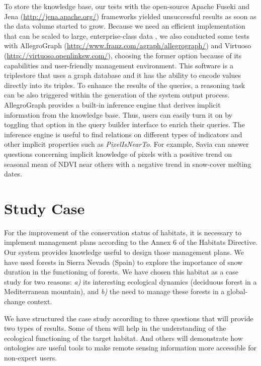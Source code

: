To store the knowledge base, our tests with the open-source Apache Fuseki and Jena (\url{http://jena.apache.org/}) frameworks yielded unsuccessful results as soon as the data volume started to grow. Because we need an efficient implementation that can be scaled to large, enterprise-class data \autocite{Wilkinsonetal2004EfficientRDF}, we also conducted some tests with AllegroGraph (\url{http://www.franz.com/agraph/allegrograph/}) and Virtuoso (\url{http://virtuoso.openlinksw.com/}), choosing the former option because of its capabilities and user-friendly management environment. This software is a triplestore that uses a graph database and it has the ability to encode values directly into its triples.
To enhance the results of the queries, a reasoning task can be also triggered within the generation of the system output process. AllegroGraph provides a built-in inference engine that derives implicit information from the knowledge base. Thus, users can easily turn it on by toggling that option in the query builder interface to enrich their queries. The inference engine is useful to find relations on different types of indicators and other implicit properties such as \emph{PixelIsNearTo}. For example, Savia can answer questions concerning implicit knowledge of pixels with a positive trend on seasonal mean of NDVI near others with a negative trend in snow-cover melting dates.

\section{Study Case}\label{sec:onto:CaseStudy}

For the improvement of the conservation status of habitats, it is necessary to implement management plans according to the Annex 6 of the Habitats Directive. Our system provides knowledge useful to design those management plans. We have used \Qp forests in Sierra Nevada (Spain) to explore the importance of snow duration in the functioning of \Qp forests. We have chosen this habitat as a case study for two reasons: \emph{a)} its interesting ecological dynamics (deciduous forest in a Mediterranean mountain), and \emph{b)} the need to manage these forests in a global-change context.

We have structured the case study according to three questions that will provide two types of results. Some of them will help in the understanding of the ecological functioning of the target habitat. And others will demonstrate how ontologies are useful tools to make remote sensing information more accessible for non-expert users.

